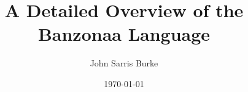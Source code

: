\documentclass[11pt,oneside]{book}
\title{A Detailed Overview of the Banzonaa Language}
\date{\today}
\author{John Sarris Burke}
\begin{document}
  \tableof{}

  \maketitle

  \tableofcontents

  
\end{document}
